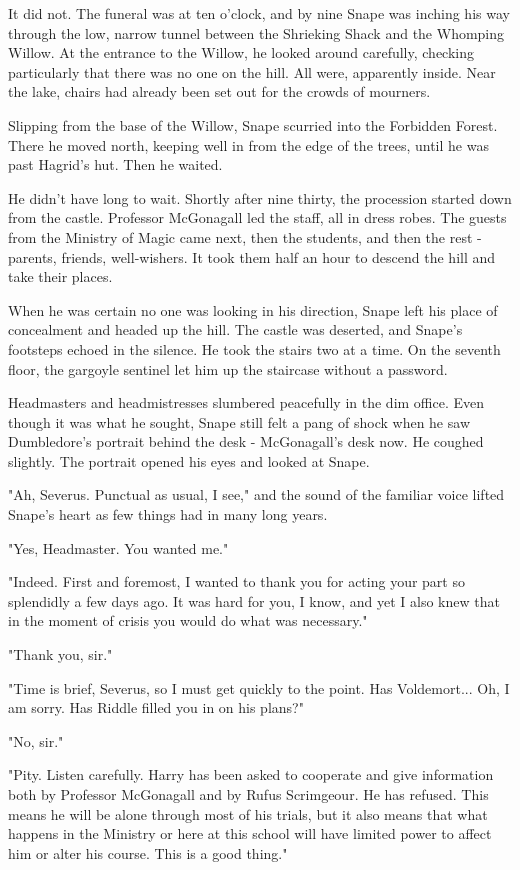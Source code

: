 \documentclass[a4paper,11pt]{article}
\begin{document}
It did not. The funeral was at ten o'clock, and by nine Snape was inching his way through the low, narrow tunnel between the Shrieking Shack and the Whomping Willow. At the entrance to the Willow, he looked around carefully, checking particularly that there was no one on the hill. All were, apparently inside. Near the lake, chairs had already been set out for the crowds of mourners.

Slipping from the base of the Willow, Snape scurried into the Forbidden Forest. There he moved north, keeping well in from the edge of the trees, until he was past Hagrid's hut. Then he waited.

He didn't have long to wait. Shortly after nine thirty, the procession started down from the castle. Professor McGonagall led the staff, all in dress robes. The guests from the Ministry of Magic came next, then the students, and then the rest - parents, friends, well-wishers. It took them half an hour to descend the hill and take their places.

When he was certain no one was looking in his direction, Snape left his place of concealment and headed up the hill. The castle was deserted, and Snape's footsteps echoed in the silence. He took the stairs two at a time. On the seventh floor, the gargoyle sentinel let him up the staircase without a password.

Headmasters and headmistresses slumbered peacefully in the dim office. Even though it was what he sought, Snape still felt a pang of shock when he saw Dumbledore's portrait behind the desk - McGonagall's desk now. He coughed slightly. The portrait opened his eyes and looked at Snape.

"Ah, Severus. Punctual as usual, I see," and the sound of the familiar voice lifted Snape's heart as few things had in many long years.

"Yes, Headmaster. You wanted me."

"Indeed. First and foremost, I wanted to thank you for acting your part so splendidly a few days ago. It was hard for you, I know, and yet I also knew that in the moment of crisis you would do what was necessary."

"Thank you, sir."

"Time is brief, Severus, so I must get quickly to the point. Has Voldemort... Oh, I am sorry. Has Riddle filled you in on his plans?"

"No, sir."

"Pity. Listen carefully. Harry has been asked to cooperate and give information both by Professor McGonagall and by Rufus Scrimgeour. He has refused. This means he will be alone through most of his trials, but it also means that what happens in the Ministry or here at this school will have limited power to affect him or alter his course. This is a good thing."
\end{document}
